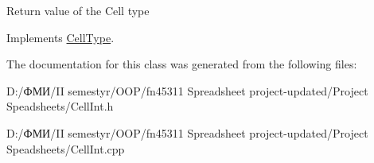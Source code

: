 Return value of the Cell type 

Implements \hyperlink{class_cell_type_a6cbfc477f605049f2a007d8674442230}{Cell\+Type}.



The documentation for this class was generated from the following files\+:\begin{DoxyCompactItemize}
\item 
D\+:/ФМИ/\+I\+I semestyr/\+O\+O\+P/fn45311 Spreadsheet project-\/updated/\+Project Speadsheets/Cell\+Int.\+h\item 
D\+:/ФМИ/\+I\+I semestyr/\+O\+O\+P/fn45311 Spreadsheet project-\/updated/\+Project Speadsheets/Cell\+Int.\+cpp\end{DoxyCompactItemize}
